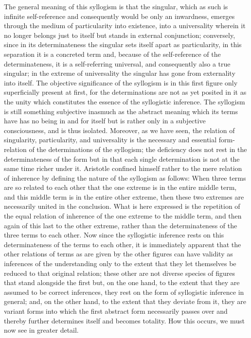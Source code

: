 The general meaning of this syllogism is that the singular,
which as such is infinite self-reference
and consequently would be only an inwardness,
emerges through the medium of particularity into existence,
into a universality wherein it no longer belongs just to itself
but stands in external conjunction;
conversely, since in its determinateness
the singular sets itself apart as particularity,
in this separation it is a concreted term
and, because of the self-reference of the determinateness,
it is a self-referring universal,
and consequently also a true singular;
in the extreme of universality the
singular has gone from externality into itself.
The objective significance of the syllogism is
in this first figure only superficially present at first,
for the determinations are not as yet posited in it
as the unity which constitutes the essence
of the syllogistic inference.
The syllogism is still something subjective
inasmuch as the abstract meaning which its terms have
has no being in and for itself
but is rather only in a subjective consciousness,
and is thus isolated.
Moreover, as we have seen, the relation of
singularity, particularity, and universality
is the necessary and essential form-relation of
the determinations of the syllogism;
the deficiency does not rest in the
determinateness of the form
but in that each single determination is not
at the same time richer under it.
Aristotle confined himself rather to the mere relation of
inherence by defining the nature of the syllogism as follows:
When three terms are so related to each other
that the one extreme is in the entire middle term,
and this middle term is in the entire other extreme,
then these two extremes are necessarily united in the conclusion.
What is here expressed is the repetition of
the equal relation of inherence
of the one extreme to the middle term,
and then again of this last to the other extreme,
rather than the determinateness of the three terms
to each other.
Now since the syllogistic inference rests
on this determinateness of the terms to each other,
it is immediately apparent that the other relations of terms
as are given by the other figures can have validity
as inferences of the understanding
only to the extent that they let themselves
be reduced to that original relation;
these other are not diverse species of figures
that stand alongside the first
but, on the one hand, to the extent that they are assumed
to be correct inferences,
they rest on the form of syllogistic inference in general;
and, on the other hand, to the extent that they deviate from it,
they are variant forms into which
the first abstract form necessarily passes over
and thereby further determines itself and becomes totality.
How this occurs, we must now see in greater detail.

